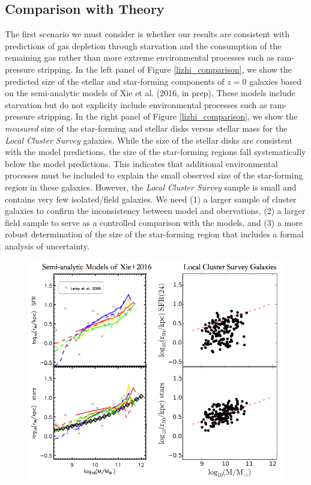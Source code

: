 \documentclass[11pt, preprint]{aastex}
\begin{document}
{\subsection{Comparison with Theory}
\vspace*{-.4cm}

The first scenario we must consider is whether our results are
consistent with predictions of gas depletion through starvation and
the consumption of the remaining gas
rather than more extreme environmental processes such as ram-pressure stripping.
In the left panel of Figure \ref{lizhi_comparison}, we show the predicted size of the
stellar and star-forming components of $z = 0$ galaxies based on the
semi-analytic models of Xie et al. (2016, in prep).  These models
include starvation but do not explicity include environmental
processes such as ram-pressure stripping.  In the right panel of
Figure \ref{lizhi_comparison}, we show the {\it measured} size of the
star-forming and stellar disks versus stellar mass for the {\it Local
  Cluster Survey} galaxies.  While the size of the stellar disks are
consistent with the model predictions, the size of the star-forming
regions fall systematically below the model predictions.  This
indicates that additional environmental processes must be included to
explain the small observed size of the star-forming region in these
galaxies.  However, the {\it Local Cluster Survey} sample is small and
contains very few isolated/field galaxies.
We need (1) a larger sample of cluster galaxies to confirm the inconsistency between model
and obervations, (2) a larger field sample to serve as a controlled
comparison with the models, and (3) a more robust determination of
the size of the star-forming region that includes a formal analysis of
uncertainty.
\begin{figure}[h!]
\begin{center}
\includegraphics[width=.85\textwidth]{lizhi_comparison.png}

\end{center}
\end{figure}}
\end{document}
